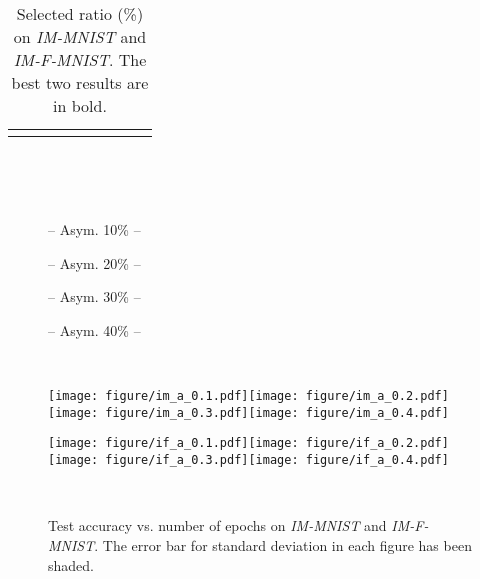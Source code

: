 \documentclass[11pt]{article}
\begin{document}
\begin{table}[!h]
\begin{tabular}{l |cccc|cccc}
		\Xhline{3\arrayrulewidth}
\end{tabular}
\caption
		{
Selected ratio (\%) on \textit{IM-MNIST} and \textit{IM-F-MNIST}. The best two results are in bold.
		}
		\vspace{-5pt}
	\label{tab:selected_ratio}
\end{table}		

\begin{figure*}[!t]
\begin{minipage}[c]{0.08\columnwidth}~\end{minipage}\centering{}
\begin{minipage}[c]{0.05\columnwidth}~\end{minipage}\begin{minipage}[c]{0.235\textwidth}\centering\small -- \scriptsize{Asym. 10\%} -- \end{minipage}\begin{minipage}[c]{0.235\textwidth}\centering\small -- \scriptsize{Asym. 20\%} -- \end{minipage}\begin{minipage}[c]{0.235\textwidth}\centering\small -- \scriptsize{Asym. 30\%} -- \end{minipage}
    \begin{minipage}[c]{0.235\textwidth}\centering\small -- \scriptsize{Asym. 40\%} -- \end{minipage}\\
    \begin{minipage}[c]{0.05\columnwidth}\centering\small {} \end{minipage}\begin{minipage}[c]{0.95\textwidth}
        \texttt{[image: figure/im\_a\_0.1.pdf]}\texttt{[image: figure/im\_a\_0.2.pdf]}\texttt{[image: figure/im\_a\_0.3.pdf]}\texttt{[image: figure/im\_a\_0.4.pdf]}\end{minipage}

\begin{minipage}[c]{0.05\columnwidth}\centering\small {} \end{minipage}\begin{minipage}[c]{0.95\textwidth}
        \texttt{[image: figure/if\_a\_0.1.pdf]}\texttt{[image: figure/if\_a\_0.2.pdf]}\texttt{[image: figure/if\_a\_0.3.pdf]}\texttt{[image: figure/if\_a\_0.4.pdf]}\end{minipage}\\

\caption{Test accuracy vs. number of epochs on \textit{IM-MNIST} and \textit{IM-F-MNIST}. The error bar for standard deviation in each figure has been shaded. 
    }
\vspace{-15pt}
\label{fig:imbalanced_dataset}
\end{figure*}
\end{document}

